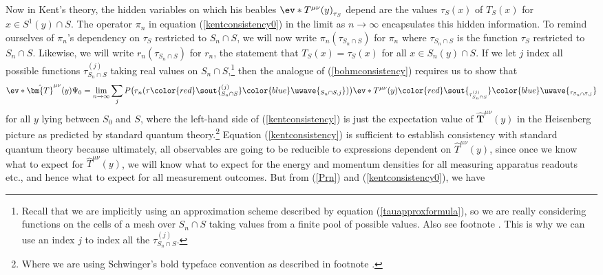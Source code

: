 \documentclass[12pt]{report}
\providecommand{\DIFadd}[1]{{\protect\color{blue}\uwave{#1}}} %
\providecommand{\DIFdel}[1]{{\protect\color{red}\sout{#1}}}                      %
\providecommand{\DIFaddbegin}{} %
\providecommand{\DIFaddend}{} %
\providecommand{\DIFdelbegin}{} %
\providecommand{\DIFdelend}{} %
\begin{document}
Now in Kent's theory, the hidden variables on which his beables $\ev*{T^{\mu\nu}(y)}_{\tau_S}$ depend are the values $\tau_S(x)$ of $T_S(x)$ for $x\in S^1(y)\cap S$. The operator $\pi_n$ in equation (\ref{kentconsistency0}) in the limit as $n\rightarrow\infty$ encapsulates this hidden information. To remind ourselves of $\pi_n$'s dependency on $\tau_S$ restricted to $S_n\cap S$, we will now write $\pi_n(\tau_{S_n\cap S})$ for %
%
 $\pi_n$ where $\tau_{S_n\cap S}$ is %
%
the function $\tau_S$ restricted to $S_n\cap S$. Likewise, we will write  $r_n(\tau_{S_n\cap S})$ for  %
%
$r_n$, the statement that $T_S(x)=\tau_S(x)$ for all $x\in S_n(y)\cap S$. If we let $j$ index all possible functions \DIFdelbegin \DIFdel{$\tau^{(j)}_{S_n\cap S}$ }\DIFdelend \DIFaddbegin \DIFadd{$\tau_{S_n\cap S, j}$ }\DIFaddend taking real values on $S_n\cap S$,\footnote{Recall that we are implicitly using an approximation scheme described by equation (\ref{tauapproxformula}), so we are really considering functions on the cells of a mesh over $S_n\cap S $ taking values from a finite pool of possible values. Also see footnote . This is why we can use an index $j$ to index all the \DIFdelbegin \DIFdel{$\tau^{(j)}_{S_n\cap S}.$}\DIFdelend \DIFaddbegin \DIFadd{$\tau_{S_n\cap S, j}.$}\DIFaddend } then the analogue of (\ref{bohmconsistency}) requires us to show that 
\begin{equation}\label{kentconsistency}
\ev*{\hat{\bm{T}}^{\mu\nu}(y)}{\Psi_0}=\lim_{n\rightarrow\infty}\sum_{j}P\big(r_n(\tau\DIFdelbegin \DIFdel{^{(j)}_{S_n\cap S}}\DIFdelend \DIFaddbegin \DIFadd{_{S_n\cap S, j}}\DIFaddend )\big)\ev*{T^{\mu\nu}(y)}\DIFdelbegin \DIFdel{_{\tau^{(j)}_{S_n\cap S}}
}\DIFdelend \DIFaddbegin \DIFadd{_{\tau_{S_n\cap S, j}}
}\DIFaddend \end{equation}
for all $y$ lying between $S_0$ and $S$, where the left-hand side of (\ref{kentconsistency}) is just the expectation value of $\hat{\bm{T}}^{\mu\nu}(y)$ in the Heisenberg picture as predicted by standard quantum theory.\footnote{Where we are using Schwinger's bold typeface convention as described in footnote .} Equation (\ref{kentconsistency}) is sufficient to establish consistency with standard quantum theory because ultimately, all observables are going to be reducible to expressions dependent on $\hat{T}^{\mu\nu}(y)$, since once we know what to expect for $\hat{T}^{\mu\nu}(y)$, we will know what to expect for the energy and momentum densities for all measuring apparatus readouts etc., and hence what to expect for all measurement outcomes. But from (\ref{Prn}) and (\ref{kentconsistency0}), we have 
\end{document}
